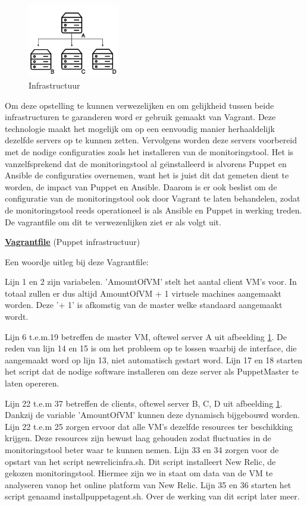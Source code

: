 \begin{figure}
  \begin{center}
\includegraphics[width=150px]{img/infrastructruur.png}
\end{center}  \caption{Infrastructuur}
  \label{fig:infrastructuur}
\end{figure}

Om deze opstelling te kunnen verwezelijken en om gelijkheid tussen beide infrastructuren te garanderen word er gebruik gemaakt van Vagrant. Deze technologie maakt het mogelijk om op een eenvoudig manier herhaaldelijk dezelfde servers op te kunnen zetten. Vervolgens worden deze servers voorbereid met de nodige configuraties zoals het installeren van de monitoringstool. Het is vanzelfsprekend dat de monitoringstool al ge{\"\i}nstalleerd is alvorens Puppet en Ansible de configuraties overnemen, want het is juist dit dat gemeten dient te worden, de impact van Puppet en Ansible. Daarom is er ook beslist om de configuratie van de monitoringstool ook door Vagrant te laten behandelen, zodat de monitoringstool reeds operationeel is als Ansible en Puppet in werking treden. De vagrantfile om dit te verwezenlijken ziet er als volgt uit.


\underline{\textbf{Vagrantfile}} (Puppet infrastructuur)


Een woordje uitleg bij deze Vagrantfile:

Lijn 1 en 2 zijn variabelen. 'AmountOfVM' stelt het aantal client VM's voor. In totaal zullen er dus altijd AmountOfVM + 1 virtuele machines aangemaakt worden. Deze '+ 1' is afkomstig van de master welke standaard aangemaakt wordt.

Lijn 6 t.e.m.19 betreffen de master VM, oftewel server A uit afbeelding  \ref{fig:infrastructuur}.
De reden van lijn 14 en 15 is om het probleem op te lossen waarbij de interface, die aangemaakt word op lijn 13, niet automatisch gestart word. 
Lijn 17 en 18 starten het script dat de nodige software installeren om deze server als PuppetMaster te laten opereren.

Lijn 22 t.e.m 37 betreffen de clients, oftewel server B, C, D uit afbeelding  \ref{fig:infrastructuur}. Dankzij de variable 'AmountOfVM' kunnen deze dynamisch bijgebouwd worden. 
Lijn 22 t.e.m 25 zorgen ervoor dat alle VM's dezelfde resources ter beschikking krijgen. Deze resources zijn bewust laag gehouden zodat fluctuaties in de monitoringstool beter waar te kunnen nemen.
Lijn 33 en 34 zorgen voor de opstart van het script newrelicinfra.sh. Dit script installeert New Relic, de gekozen monitoringstool. Hiermee zijn we in staat om data van de VM  te analyseren vanop het online platform van New Relic.
Lijn 35 en 36 starten het script genaamd installpuppetagent.sh. Over de werking van dit script later meer.

